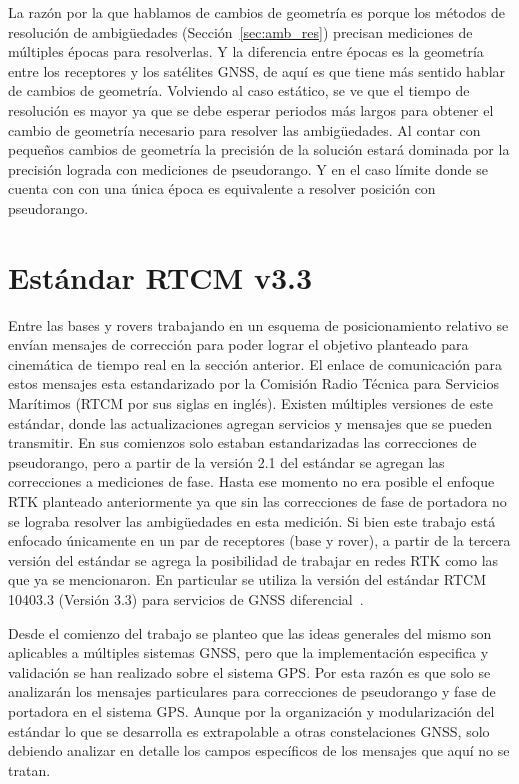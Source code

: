 \documentclass[a4paper,12pt,oneside,onecolumn,final,openright]{book}%
\begin{document}
	La razón por la que hablamos de cambios de geometría es porque los métodos de resolución de ambigüedades (Sección~\ref{sec:amb_res}) precisan mediciones de múltiples épocas para resolverlas. Y la diferencia entre épocas es la geometría entre los receptores y los satélites GNSS, de aquí es que tiene más sentido hablar de cambios de geometría. Volviendo al caso estático, se ve que el tiempo de resolución es mayor ya que se debe esperar periodos más largos para obtener el cambio de geometría necesario para resolver las ambigüedades. Al contar con pequeños cambios de geometría la precisión de la solución estará dominada por la precisión lograda con mediciones de pseudorango. Y en el caso límite donde se cuenta con con una única época es equivalente a resolver posición con pseudorango.

\section{Estándar RTCM v3.3}\label{sec:RTCM}
	Entre las bases y rovers trabajando en un esquema de posicionamiento relativo se envían mensajes de corrección para poder lograr el objetivo planteado para cinemática de tiempo real en la sección anterior. El enlace de comunicación para estos mensajes esta estandarizado por la Comisión Radio Técnica para Servicios Marítimos (RTCM por sus siglas en inglés). Existen múltiples versiones de este estándar, donde las actualizaciones agregan servicios y mensajes que se pueden transmitir. En sus comienzos solo estaban estandarizadas las correcciones de pseudorango, pero a partir de la versión 2.1 del estándar se agregan las correcciones a mediciones de fase. Hasta ese momento no era posible el enfoque RTK planteado anteriormente ya que sin las correcciones de fase de portadora no se lograba resolver las ambigüedades en esta medición. Si bien este trabajo está enfocado únicamente en un par de receptores (base y rover), a partir de la tercera versión del estándar se agrega la posibilidad de trabajar en redes RTK como las que ya se mencionaron. En particular se utiliza la versión del estándar RTCM 10403.3 (Versión 3.3) para servicios de GNSS diferencial~\cite{rtcm}.
	
	Desde el comienzo del trabajo se planteo que las ideas generales del mismo son aplicables a múltiples sistemas GNSS, pero que la implementación especifica y validación se han realizado sobre el sistema GPS. Por esta razón es que solo se analizarán los mensajes particulares para correcciones de pseudorango y fase de portadora en el sistema GPS. Aunque por la organización y modularización del estándar lo que se desarrolla es extrapolable a otras constelaciones GNSS, solo debiendo analizar en detalle los campos específicos de los mensajes que aquí no se tratan.
	
\end{document}
